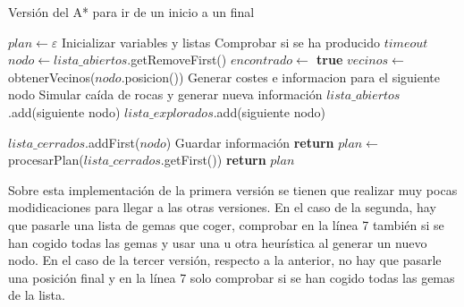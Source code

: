 \documentclass[11pt,a4paper]{article}
\begin{document}
\begin{algorithm}[H]
\caption{Versión del A* para ir de un inicio a un final}
\begin{algorithmic}[1]
\State $plan \gets \varepsilon$
\State Inicializar variables y listas
	\State Comprobar si se ha producido $timeout$
	\State $nodo \gets lista\_abiertos$.getRemoveFirst()
		\State \textbf{$encontrado \gets $ true}
	\Else{}
		$vecinos \gets $ obtenerVecinos($nodo$.posicion())
				\State Generar costes e informacion para el siguiente nodo
					\State Simular caída de rocas y generar nueva información
				\EndIf
					\State $lista\_abiertos$.add(siguiente nodo)
					\State $lista\_explorados$.add(siguiente nodo)
				\EndIf{}
			\EndIf{}
		\EndFor
	\EndIf
	
	\State $lista\_cerrados$.addFirst($nodo$)
\EndWhile
{}
	\State Guardar información
	\State \textbf{return}
\EndIf
{}
	\State $plan \gets$ procesarPlan($lista\_cerrados$.getFirst())
\EndIf
\State \textbf{return} $plan$
\EndProcedure
\end{algorithmic}
\end{algorithm}

Sobre esta implementación de la primera versión se tienen que realizar muy pocas modidicaciones para
llegar a las otras versiones. En el caso de la segunda, hay que pasarle una lista de gemas que coger,
comprobar en la línea 7 también si se han cogido todas las gemas y usar una u otra heurística al generar
un nuevo nodo. En el caso de la tercer versión, respecto a la anterior, no hay que pasarle una posición
final y en la línea 7 solo comprobar si se han cogido todas las gemas de la lista.
\end{document}
